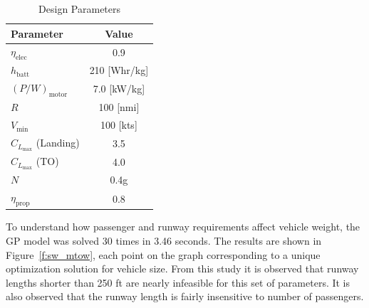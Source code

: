 \documentclass[]{aiaa-tc}%
\begin{document}
\begin{table}[H]
    \centering
    \caption{Design Parameters}
    \label{t:params}
    \begin{tabular}{l c}
    \toprule
    \toprule
    Parameter                                   & Value         \\ \hline
    $\eta_{\mathrm{elec}}$                      & 0.9           \\
    $h_{\mathrm{batt}}$                         & 210 [Whr/kg]  \\
    $(P/W)_{\mathrm{motor}}$                         & 7.0 [kW/kg] \\
    $R$                                         & 100 [nmi]     \\
    $V_{\mathrm{min}}$                          & 100 [kts]     \\
    $C_{L_{\mathrm{max}}}$ (Landing)            & 3.5           \\
    $C_{L_{\mathrm{max}}}$ (TO)                 & 4.0           \\
    $N$                                         & 0.4g          \\
    $\eta_{\mathrm{prop}}$                      & 0.8           \\
    \bottomrule
\end{tabular}
\end{table}

To understand how passenger and runway requirements affect vehicle weight, the GP model was solved 30 times in 3.46 seconds.  
The results are shown in Figure~\ref{f:sw_mtow}, each point on the graph corresponding to a unique optimization solution for vehicle size.  
From this study it is observed that runway lengths shorter than 250 ft are nearly infeasible for this set of parameters.  
It is also observed that the runway length is fairly insensitive to number of passengers.  
\end{document}
